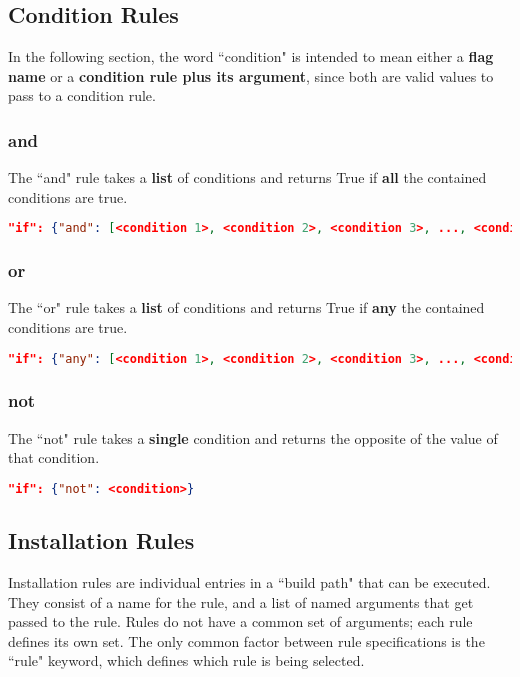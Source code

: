 \documentclass{article}
\begin{document}
\subsection{Condition Rules}\label{section:conditionrules}
In the following section, the word ``condition" is intended to mean either a \textbf{flag name} or a \textbf{condition rule plus its argument}, since both are valid values to pass to a condition rule.
\subsubsection{and}
The ``and" rule takes a \textbf{list} of conditions and returns True if \textbf{all} the contained conditions are true.
\begin{lstlisting}[language=json,firstnumber=1]
"if": {"and": [<condition 1>, <condition 2>, <condition 3>, ..., <condition N>]}
\end{lstlisting}
\subsubsection{or}
The ``or" rule takes a \textbf{list} of conditions and returns True if \textbf{any} the contained conditions are true.
\begin{lstlisting}[language=json,firstnumber=1]
"if": {"any": [<condition 1>, <condition 2>, <condition 3>, ..., <condition N>]}
\end{lstlisting}
\subsubsection{not}
The ``not" rule takes a \textbf{single} condition and returns the opposite of the value of that condition.
\begin{lstlisting}[language=json,firstnumber=1]
"if": {"not": <condition>}
\end{lstlisting}
\newpage
\subsection{Installation Rules}\label{section:installationrules}
Installation rules are individual entries in a ``build path" that can be executed. They consist of a name for the rule, and a list of named arguments that get passed to the rule. Rules do not have a common set of arguments; each rule defines its own set. The only common factor between rule specifications is the ``rule" keyword, which defines which rule is being selected.
\end{document}
